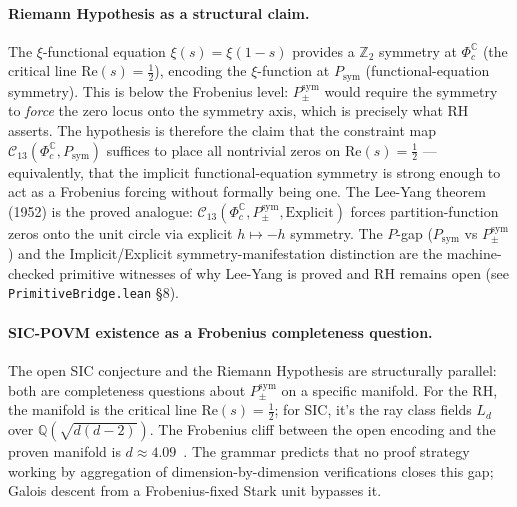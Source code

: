 \documentclass[12pt,a4paper]{article}
\newcommand{\Phic}{\Phi_c}
\newcommand{\Ppms}{P_{\pm}^{\text{sym}}}
\begin{document}
\paragraph{Riemann Hypothesis as a structural claim.}
The $\xi$-functional equation $\xi(s) = \xi(1-s)$ provides a
$\mathbb{Z}_2$ symmetry at $\Phic^{\mathbb{C}}$ (the critical line
$\text{Re}(s) = \tfrac{1}{2}$), encoding the $\xi$-function at
$P_\text{sym}$ (functional-equation symmetry). This is below the
Frobenius level: $P_{\pm}^{\text{sym}}$ would require the symmetry
to \emph{force} the zero locus onto the symmetry axis, which is
precisely what RH asserts. The hypothesis is therefore the claim
that the constraint map $\mathcal{C}_{13}(\Phic^{\mathbb{C}},
P_\text{sym})$ suffices to place all nontrivial zeros on
$\text{Re}(s) = \tfrac{1}{2}$ — equivalently, that the implicit
functional-equation symmetry is strong enough to act as a Frobenius
forcing without formally being one. The Lee-Yang theorem (1952) is
the proved analogue: $\mathcal{C}_{13}(\Phic^{\mathbb{C}},
P_{\pm}^{\text{sym}}, \text{Explicit})$ forces partition-function
zeros onto the unit circle via explicit $h \mapsto -h$ symmetry.
The $P$-gap ($P_\text{sym}$ vs $P_{\pm}^{\text{sym}}$) and the
Implicit/Explicit symmetry-manifestation distinction are the
machine-checked primitive witnesses of why Lee-Yang is proved and
RH remains open (see \texttt{PrimitiveBridge.lean} §8).

\paragraph{SIC-POVM existence as a Frobenius completeness question.}
The open SIC conjecture and the Riemann Hypothesis are structurally parallel:
both are completeness questions about $\Ppms$ on a specific manifold. For the
RH, the manifold is the critical line $\text{Re}(s) = \tfrac{1}{2}$; for SIC,
it's the ray class fields $L_d$ over $\mathbb{Q}(\sqrt{d(d-2)})$. The
Frobenius cliff between the open encoding and the proven manifold is $d \approx
4.09$~\cite{mills2026sic}. The grammar predicts that no proof strategy working
by aggregation of dimension-by-dimension verifications closes this gap; Galois
descent from a Frobenius-fixed Stark unit bypasses it.
\end{document}
